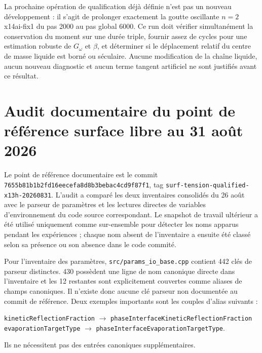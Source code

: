 \documentclass[11pt,a4paper]{article}
\begin{document}
La prochaine opération de qualification déjà définie n'est pas un nouveau développement : il s'agit de prolonger exactement la goutte oscillante $n=2$ x14ai-fix1 du pas 2000 au pas global 6000. Ce run doit vérifier simultanément la conservation du moment sur une durée triple, fournir assez de cycles pour une estimation robuste de $G_\omega$ et $\beta$, et déterminer si le déplacement relatif du centre de masse liquide est borné ou séculaire. Aucune modification de la chaîne liquide, aucun nouveau diagnostic et aucun terme tangent artificiel ne sont justifiés avant ce résultat.


\section{Audit documentaire du point de référence surface libre au 31 août 2026}
\label{sec:inventory-audit-7655}

Le point de référence documentaire est le commit \nolinkurl{7655b81b1b2fd16eecefa8d8b3bebac4cd9f87f1}, tag \nolinkurl{surf-tension-qualified-x13h-20260831}. L'audit a comparé les deux inventaires consolidés du 26 août avec le parseur de paramètres et les lectures directes de variables d'environnement du code source correspondant. Le snapshot de travail ultérieur a été utilisé uniquement comme sur-ensemble pour détecter les noms apparus pendant les expériences ; chaque nom absent de l'inventaire a ensuite été classé selon sa présence ou son absence dans le code commité.

Pour l'inventaire des paramètres, \nolinkurl{src/params_io_base.cpp} contient 442 clés de parseur distinctes. 430 possèdent une ligne de nom canonique directe dans l'inventaire et les 12 restantes sont explicitement couvertes comme aliases de champs canoniques. Il n'existe donc aucune clé parseur non documentée au commit de référence. Deux exemples importants sont les couples d'alias suivants :
\begin{center}
\small
\nolinkurl{kineticReflectionFraction} $\rightarrow$ \nolinkurl{phaseInterfaceKineticReflectionFraction}\\
\nolinkurl{evaporationTargetType} $\rightarrow$ \nolinkurl{phaseInterfaceEvaporationTargetType}.
\end{center}
Ils ne nécessitent pas des entrées canoniques supplémentaires.
\end{document}
